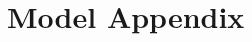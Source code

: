 \documentclass[11pt]{article}
\begin{document}
	
	
	\let\bibfont=\small
	
	
	
	\appendix
	\section{Model Appendix}
	
	
	
\end{document}
